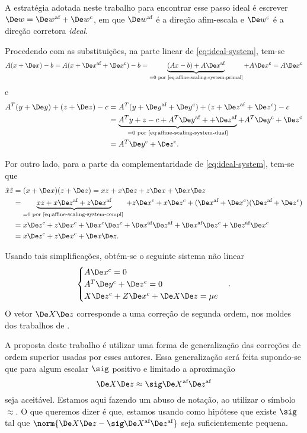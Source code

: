 A estratégia adotada neste trabalho para encontrar esse passo ideal é  escrever
$\Dew = \dew + \Decow$, em que  $\dew$ é a direção afim-escala e $\Decow$ é a direção corretora 
\emph{ideal}.

Procedendo com as substituições, na parte linear de \eqref{eq:ideal-system},
tem-se
\[ A(x+\Dex) - b = A(x+\dex + \Decox) - b = \underbrace{(Ax - b) + A\dex}_{=0
\text{ por \eqref{eq:affine-scaling-system-primal}}} + A\Decox = A\Decox \] 
e
\begin{align*}
A^T(y+\Dey) + (z+\Dez) - c &= A^T(y+\dey+\Decoy) + (z+\dez+\Decoz) - c \\
						  &= \underbrace{A^Ty + z - c + A^T\dey+ +\dez}_{=0 
						  \text{ por \eqref{eq:affine-scaling-system-dual}}} +
						   A^T\Decoy +\Decoz \\
						  &=  A^T\Decoy +\Decoz.
\end{align*} 

Por outro lado, para a parte da complementaridade de 
\eqref{eq:ideal-system}, tem-se que
\begin{align*}
\hat{x}\hat{z} &= (x + \Dex)(z+\Dez) = xz + x\Dez + z\Dex + \Dex\Dez \\
                &= \underbrace{xz + x\dez + z\dex}_{=0 \text{ por
                \eqref{eq:affine-scaling-system-compl} }}  + z\Dex^c + x\Dez^c + (\dex + \Dex^c)(\dez + \Dez^c) \\
                &=  x\Dez^c  +z\Dex^c + \Dex^c\Dez^c + \dex\dez 
                + \dex\Dez^c + \dez\Dex^c \\
                &=         x\Dez^c  +z\Dex^c + \Dex\Dez.     
\end{align*}
  
Usando tais simplificações, obtém-se o seguinte sistema não linear
\begin{equation}\begin{cases}
A\Dex^c =  0\\
A^T\Dey^c +\Dez^c =  0\\
X\Dez^c + Z\Dex^c + \DeX\Dez = \mu e 
\label{eq:corrector-nonlinear}
\end{cases}.
\end{equation}
O vetor $\DeX\Dez$ corresponde a uma correção de segunda ordem, nos moldes dos
trabalhos de \textcite{Mehrotra:1992wr,Gondzio:1996uw}.



A proposta deste trabalho é utilizar uma  forma de generalização das correções
de ordem superior usadas por esses autores.
Essa generalização será feita supondo-se que para algum escalar
$\sig$ positivo e limitado a aproximação
\begin{equation}
\label{eq:aproximacao-direcao}
\DeX\Dez \approx \sig \deX\dez
\end{equation} 
seja aceitável. Estamos aqui fazendo um abuso de notação, ao utilizar o símbolo $\approx$. O que queremos dizer é que, estamos usando como hipótese que existe $\sig$ tal que $\norm{\DeX\Dez - \sig \deX\dez}$ seja suficientemente pequena.

